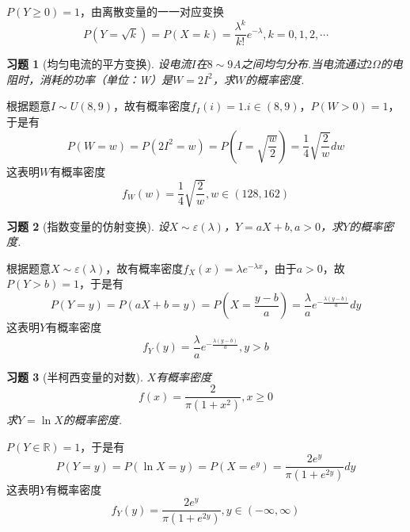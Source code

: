 \documentclass[UTF8,12pt,a4paper,fontset=fandol]{ctexart}
\newtheorem{exercise}{习题}[section]
\begin{document}
\begin{solve}\label{a:Y3.16}
$P(Y\geqslant 0)=1$，由离散变量的一一对应变换
\[P(Y = \sqrt k ) = P(X = k) = \frac{{{\lambda ^k}}}{{k!}}{e^{ - \lambda }},k = 0,1,2, \cdots \]
\end{solve}

\begin{exercise}[均匀电流的平方变换]\label{q:Y3.17}
设电流$I$在$8\sim 9$A之间均匀分布.当电流通过$2\Omega$的电阻时，消耗的功率（单位：W）是$W=2I^2$，求$W$的概率密度.\par{}
\end{exercise}

\begin{solve}\label{a:Y3.17}
根据题意$I\sim U(8,9)$，故有概率密度$f_I(i)=1.i\in (8,9)$，$P(W>0)=1$，于是有
\[P(W = w) = P(2{I^2} = w) = P(I = \sqrt {\frac{w}{2}} ) = \frac{1}{4}\sqrt {\frac{2}{w}} dw\]
这表明$W$有概率密度
\[{f_W}(w) = \frac{1}{4}\sqrt {\frac{2}{w}},w\in(128,162) \]
\end{solve}

\begin{exercise}[指数变量的仿射变换]\label{q:Y3.18}
设$X\sim \varepsilon(\lambda)$，$Y=aX+b,a>0$，求$Y$的概率密度.\par{}
\end{exercise}

\begin{solve}\label{a:Y3.18}
根据题意$X\sim \varepsilon(\lambda)$，故有概率密度$f_X(x)=\lambda e^{-\lambda x}$，由于$a>0$，故$P(Y>b)=1$，于是有
\[P(Y = y) = P(aX + b = y) = P(X = \frac{{y - b}}{a}) = \frac{\lambda }{a}{e^{ - \frac{{\lambda (y - b)}}{a}}}dy\]
这表明$Y$有概率密度
\[{f_Y}(y) = \frac{\lambda }{a}{e^{ - \frac{{\lambda (y - b)}}{a}}},y > b\]
\end{solve}

\begin{exercise}[半柯西变量的对数]\label{q:Y3.19}
$X$有概率密度
\[f(x)=\frac{2}{\pi(1+x^2)},x\geqslant 0\]
求$Y=\ln X$的概率密度.\par{}
\end{exercise}

\begin{solve}\label{a:Y3.19}
$P(Y\in \mathbb{R})=1$，于是有 
\[P(Y = y) = P(\ln X = y) = P(X = {e^y}) = \frac{{2{e^y}}}{{\pi (1 + {e^{2y}})}}dy\]
这表明$Y$有概率密度
\[{f_Y}(y) = \frac{{2{e^y}}}{{\pi (1 + {e^{2y}})}},y \in ( - \infty ,\infty )\]
\end{solve}
\end{document}
